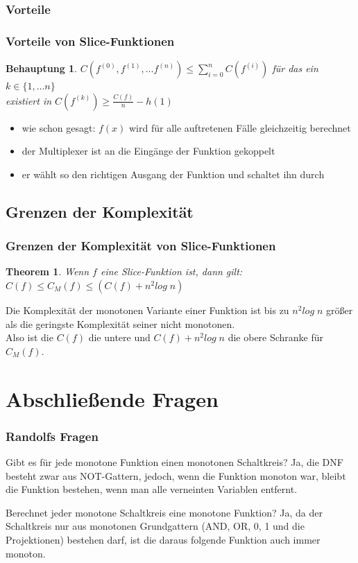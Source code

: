 \documentclass[hyperref={pdfpagelabels=false}]{beamer} %
\newtheorem{thm}{Theorem}
\newtheorem{beh}{Behauptung}
\begin{document}
  \subsubsection*{Vorteile}
  \begin{frame}
    \frametitle{Vorteile von Slice-Funktionen}
    \begin{beh}
      $C(f^{(0)}, f^{(1)}, \dots f^{(n)}) \leq \sum_{i=0}^{n}{C(f^{(i)})}$ für das ein $k \in \{1, \dots n\}$\\
      existiert in $C(f^{(k)}) \geq \frac{C(f)}{n} - h(1)$
    \end{beh}
    \begin{itemize}
      \item wie schon gesagt: $f(x)$ wird für alle auftretenen Fälle gleichzeitig berechnet
      \item der Multiplexer ist an die Eingänge der Funktion gekoppelt
      \item er wählt so den richtigen Ausgang der Funktion und schaltet ihn durch
    \end{itemize}
  \end{frame}

  \subsection*{Grenzen der Komplexität}
  \begin{frame}%
    \frametitle{Grenzen der Komplexität von Slice-Funktionen}
    \begin{thm}
      Wenn $f$ eine Slice-Funktion ist, dann gilt:
      $C(f) \leq C_M(f) \leq (C(f) +n^2 log\;n)$%
    \end{thm}
    Die Komplexität der monotonen Variante einer Funktion ist bis zu $n^2 log\;n$ größer als die geringste Komplexität seiner nicht monotonen.\\
    Also ist die $C(f)$ die untere und $C(f) + n^2 log\;n$ die obere Schranke für $C_M(f)$.
  \end{frame}

  \section{Abschließende Fragen}
  \begin{frame}%
    \frametitle{Randolfs Fragen}
    \begin{block}{Gibt es für jede monotone Funktion einen monotonen Schaltkreis?}
      Ja, die DNF besteht zwar aus NOT-Gattern, jedoch, wenn die Funktion monoton war, bleibt die Funktion bestehen, wenn man alle verneinten Variablen entfernt.
    \end{block}
    \begin{block}{Berechnet jeder monotone Schaltkreis eine monotone Funktion?}
      Ja, da der Schaltkreis nur aus monotonen Grundgattern (AND, OR, 0, 1 und die Projektionen) bestehen darf, ist die daraus folgende Funktion auch immer monoton.
    \end{block}
  \end{frame}
\end{document}
